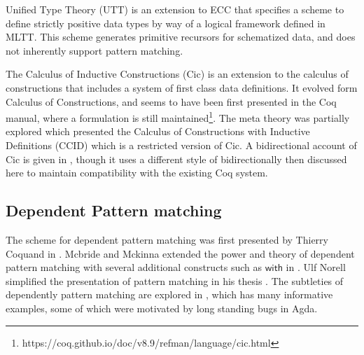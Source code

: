 
Unified Type Theory (\ac{UTT})\cite{luo1990extended,luo1994computation} is an extension to \ac{ECC} that specifies a scheme to define strictly positive data types by way of a logical framework defined in \ac{MLTT}.
This scheme generates primitive recursors for schematized data, and does not inherently support pattern matching.

The Calculus of Inductive Constructions (\ac{Cic}) is an extension to the calculus of constructions that includes a system of first class data definitions.
It evolved form Calculus of Constructions, and seems to have been first presented in the Coq manual, where a formulation is still maintained\footnote{https://coq.github.io/doc/v8.9/refman/language/cic.html}.
The meta theory was partially explored \cite{10.1007/BFb0037116} which presented the  Calculus of Constructions with Inductive Definitions (CCID) which is a restricted version of \ac{Cic}.
A bidirectional account of \ac{Cic} is given in \cite{lennonbertrand:LIPIcs.ITP.2021.24}, though it uses a different style of bidirectionally then discussed here to maintain compatibility with the existing Coq system.


\subsection{Dependent Pattern matching}


The scheme for dependent pattern matching was first presented by Thierry Coquand in \cite{coquand1992pattern}.
Mcbride and Mckinna extended the power and theory of dependent pattern matching with several additional constructs such as $\mathsf{with}$ in \cite{mcbride_mckinna_2004}.
Ulf Norell simplified the presentation of pattern matching in his thesis \cite{norell2007towards}.
The subtleties of dependently pattern matching are explored in \cite{cockx_devriese_2018}, which has many informative examples, some of which were motivated by long standing bugs in Agda.





